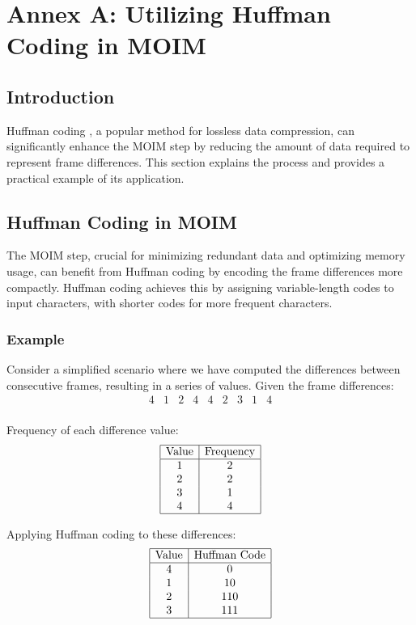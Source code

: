 \documentclass[twocolumn]{article}
\begin{document}



\clearpage
\newpage
\appendix
\section{Annex A: Utilizing Huffman Coding in MOIM}
\label{appendix:a}
\subsection{Introduction}
Huffman coding \cite{huffman1952method}, a popular method for lossless data compression, can significantly enhance the MOIM step by reducing the amount of data required to represent frame differences. This section explains the process and provides a practical example of its application.

\subsection{Huffman Coding in MOIM}
The MOIM step, crucial for minimizing redundant data and optimizing memory usage, can benefit from Huffman coding by encoding the frame differences more compactly. Huffman coding achieves this by assigning variable-length codes to input characters, with shorter codes for more frequent characters. 

\subsubsection{Example}
Consider a simplified scenario where we have computed the differences between consecutive frames, resulting in a series of values. Given the frame differences:
\[
\begin{array}{ccccccccc}
4 & 1 & 2 & 4 & 4 & 2 & 3 & 1 & 4 \\
\end{array}
\]

Frequency of each difference value:
\[
\begin{array}{|c|c|}
\hline
\text{Value} & \text{Frequency} \\
\hline
1 & 2 \\
2 & 2 \\
3 & 1 \\
4 & 4 \\
\hline
\end{array}
\]

Applying Huffman coding to these differences:
\[
\begin{array}{|c|c|}
\hline
\text{Value} & \text{Huffman Code} \\
\hline
4 & 0 \\
1 & 10 \\
2 & 110 \\
3 & 111 \\
\hline
\end{array}
\]
\end{document}
